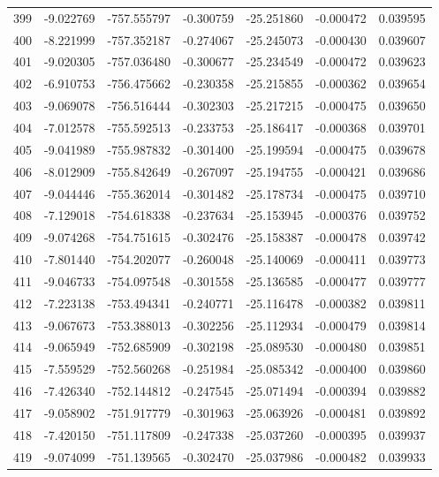 \begin{tabular}{rrrrrrr}
 399 &  -9.022769 & -757.555797 & -0.300759 & -25.251860 &  -0.000472 &  0.039595 \\
 400 &  -8.221999 & -757.352187 & -0.274067 & -25.245073 &  -0.000430 &  0.039607 \\
 401 &  -9.020305 & -757.036480 & -0.300677 & -25.234549 &  -0.000472 &  0.039623 \\
 402 &  -6.910753 & -756.475662 & -0.230358 & -25.215855 &  -0.000362 &  0.039654 \\
 403 &  -9.069078 & -756.516444 & -0.302303 & -25.217215 &  -0.000475 &  0.039650 \\
 404 &  -7.012578 & -755.592513 & -0.233753 & -25.186417 &  -0.000368 &  0.039701 \\
 405 &  -9.041989 & -755.987832 & -0.301400 & -25.199594 &  -0.000475 &  0.039678 \\
 406 &  -8.012909 & -755.842649 & -0.267097 & -25.194755 &  -0.000421 &  0.039686 \\
 407 &  -9.044446 & -755.362014 & -0.301482 & -25.178734 &  -0.000475 &  0.039710 \\
 408 &  -7.129018 & -754.618338 & -0.237634 & -25.153945 &  -0.000376 &  0.039752 \\
 409 &  -9.074268 & -754.751615 & -0.302476 & -25.158387 &  -0.000478 &  0.039742 \\
 410 &  -7.801440 & -754.202077 & -0.260048 & -25.140069 &  -0.000411 &  0.039773 \\
 411 &  -9.046733 & -754.097548 & -0.301558 & -25.136585 &  -0.000477 &  0.039777 \\
 412 &  -7.223138 & -753.494341 & -0.240771 & -25.116478 &  -0.000382 &  0.039811 \\
 413 &  -9.067673 & -753.388013 & -0.302256 & -25.112934 &  -0.000479 &  0.039814 \\
 414 &  -9.065949 & -752.685909 & -0.302198 & -25.089530 &  -0.000480 &  0.039851 \\
 415 &  -7.559529 & -752.560268 & -0.251984 & -25.085342 &  -0.000400 &  0.039860 \\
 416 &  -7.426340 & -752.144812 & -0.247545 & -25.071494 &  -0.000394 &  0.039882 \\
 417 &  -9.058902 & -751.917779 & -0.301963 & -25.063926 &  -0.000481 &  0.039892 \\
 418 &  -7.420150 & -751.117809 & -0.247338 & -25.037260 &  -0.000395 &  0.039937 \\
 419 &  -9.074099 & -751.139565 & -0.302470 & -25.037986 &  -0.000482 &  0.039933 \\

\end{tabular}
